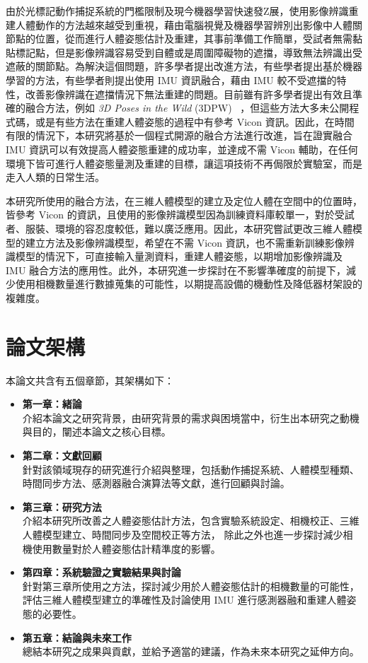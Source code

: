 由於光標記動作捕捉系統的門檻限制及現今機器學習快速發Z展，使用影像辨識重建人體動作的方法越來越受到重視，藉由電腦視覺及機器學習辨別出影像中人體關節點的位置，從而進行人體姿態估計及重建，其事前準備工作簡單，受試者無需黏貼標記點，但是影像辨識容易受到自體或是周圍障礙物的遮擋，導致無法辨識出受遮蔽的關節點。為解決這個問題，許多學者提出改進方法，有些學者提出基於機器學習的方法，有些學者則提出使用 IMU 資訊融合，藉由 IMU 較不受遮擋的特性，改善影像辨識在遮擋情況下無法重建的問題。目前雖有許多學者提出有效且準確的融合方法，例如  \textit{3D Poses in the Wild} (3DPW) ~\cite{vonMarcard2018}，但這些方法大多未公開程式碼，或是有些方法在重建人體姿態的過程中有參考 Vicon 資訊。因此，在時間有限的情況下，本研究將基於一個程式開源的融合方法進行改進，旨在證實融合 IMU 資訊可以有效提高人體姿態重建的成功率，並達成不需 Vicon 輔助，在任何環境下皆可進行人體姿態量測及重建的目標，讓這項技術不再侷限於實驗室，而是走入人類的日常生活。

本研究所使用的融合方法，在三維人體模型的建立及定位人體在空間中的位置時，皆參考 Vicon 的資訊，且使用的影像辨識模型因為訓練資料庫較單一，對於受試者、服裝、環境的容忍度較低，難以廣泛應用。因此，本研究嘗試更改三維人體模型的建立方法及影像辨識模型，希望在不需 Vicon 資訊，也不需重新訓練影像辨識模型的情況下，可直接輸入量測資料，重建人體姿態，以期增加影像辨識及 IMU 融合方法的應用性。此外，本研究進一步探討在不影響準確度的前提下，減少使用相機數量進行數據蒐集的可能性，以期提高設備的機動性及降低器材架設的複雜度。


\section{論文架構}
本論文共含有五個章節，其架構如下：

\begin{itemize}
    \item \textbf{第一章：緒論}
    \\ 介紹本論文之研究背景，由研究背景的需求與困境當中，衍生出本研究之動機與目的，闡述本論文之核心目標。
    \item \textbf{第二章：文獻回顧}
    \\ 針對該領域現存的研究進行介紹與整理，包括動作捕捉系統、人體模型種類、時間同步方法、感測器融合演算法等文獻，進行回顧與討論。
    \item \textbf{第三章：研究方法}
    \\ 介紹本研究所改善之人體姿態估計方法，包含實驗系統設定、相機校正、三維人體模型建立、時間同步及空間校正等方法，
    除此之外也進一步探討減少相機使用數量對於人體姿態估計精準度的影響。
    \item \textbf{第四章：系統驗證之實驗結果與討論}
    \\ 針對第三章所使用之方法，探討減少用於人體姿態估計的相機數量的可能性，評估三維人體模型建立的準確性及討論使用 IMU 進行感測器融和重建人體姿態的必要性。
    \item \textbf{第五章：結論與未來工作}
    \\ 總結本研究之成果與貢獻，並給予適當的建議，作為未來本研究之延伸方向。
\end{itemize}

\clearpage